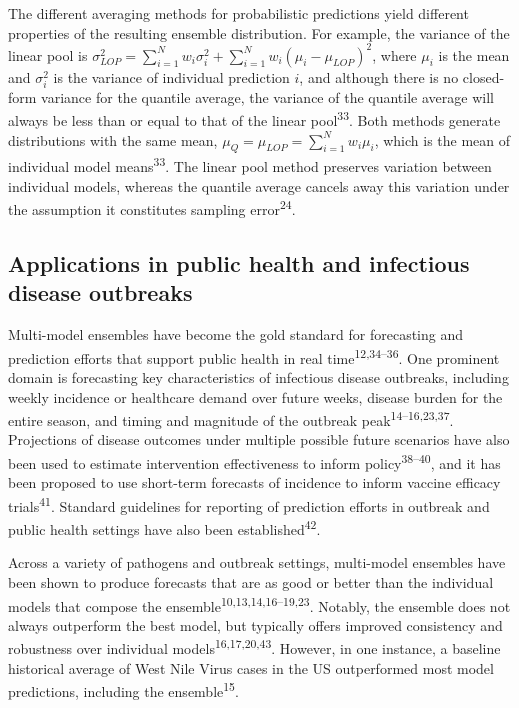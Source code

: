 \documentclass[
  letterpaper,
  DIV=11,
  numbers=noendperiod]{scrartcl}
\begin{document}
The different averaging methods for probabilistic predictions yield
different properties of the resulting ensemble distribution. For
example, the variance of the linear pool is
\(\sigma^2_{LOP} = \sum_{i=1}^Nw_i\sigma_i^2 + \sum_{i=1}^Nw_i(\mu_i-\mu_{LOP})^2\),
where \(\mu_i\) is the mean and \(\sigma^2_i\) is the variance of
individual prediction \(i\), and although there is no closed-form
variance for the quantile average, the variance of the quantile average
will always be less than or equal to that of the linear
pool\textsuperscript{33}. Both methods generate distributions with the
same mean, \(\mu_Q = \mu_{LOP} = \sum_{i=1}^Nw_i\mu_i\), which is the
mean of individual model means\textsuperscript{33}. The linear pool
method preserves variation between individual models, whereas the
quantile average cancels away this variation under the assumption it
constitutes sampling error\textsuperscript{24}.

\subsection{Applications in public health and infectious disease
outbreaks}\label{applications-in-public-health-and-infectious-disease-outbreaks}

Multi-model ensembles have become the gold standard for forecasting and
prediction efforts that support public health in real
time\textsuperscript{12,34--36}. One prominent domain is forecasting key
characteristics of infectious disease outbreaks, including weekly
incidence or healthcare demand over future weeks, disease burden for the
entire season, and timing and magnitude of the outbreak
peak\textsuperscript{14--16,23,37}. Projections of disease outcomes
under multiple possible future scenarios have also been used to estimate
intervention effectiveness to inform policy\textsuperscript{38--40}, and
it has been proposed to use short-term forecasts of incidence to inform
vaccine efficacy trials\textsuperscript{41}. Standard guidelines for
reporting of prediction efforts in outbreak and public health settings
have also been established\textsuperscript{42}.

Across a variety of pathogens and outbreak settings, multi-model
ensembles have been shown to produce forecasts that are as good or
better than the individual models that compose the
ensemble\textsuperscript{10,13,14,16--19,23}. Notably, the ensemble does
not always outperform the best model, but typically offers improved
consistency and robustness over individual
models\textsuperscript{16,17,20,43}. However, in one instance, a
baseline historical average of West Nile Virus cases in the US
outperformed most model predictions, including the
ensemble\textsuperscript{15}.
\end{document}
